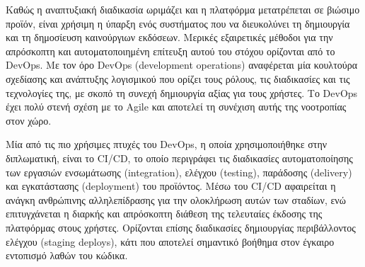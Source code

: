 Καθώς η αναπτυξιακή διαδικασία ωριμάζει και η πλατφόρμα μετατρέπεται σε βιώσιμο προϊόν, είναι χρήσιμη η ύπαρξη ενός συστήματος που να διευκολύνει τη δημιουργία και τη δημοσίευση καινούργιων εκδόσεων. Μερικές εξαιρετικές μέθοδοι για την απρόσκοπτη και αυτοματοποιημένη επίτευξη αυτού του στόχου ορίζονται από το DevOps. Με τον όρο DevOps (development operations) αναφέρεται μία κουλτούρα σχεδίασης και ανάπτυξης λογισμικού που ορίζει τους ρόλους, τις διαδικασίες και τις τεχνολογίες της, με σκοπό τη συνεχή δημιουργία αξίας για τους χρήστες. Το DevOps έχει πολύ στενή σχέση με το Agile και αποτελεί τη συνέχιση αυτής της νοοτροπίας στον χώρο.

Μία από τις πιο χρήσιμες πτυχές του DevOps, η οποία χρησιμοποιήθηκε στην διπλωματική, είναι το CI/CD, το οποίο περιγράφει τις διαδικασίες αυτοματοποίησης των εργασιών ενσωμάτωσης (integration), ελέγχου (testing), παράδοσης (delivery) και εγκατάστασης (deployment) του προϊόντος. Μέσω του CI/CD αφαιρείται η ανάγκη ανθρώπινης αλληλεπίδρασης για την ολοκλήρωση αυτών των σταδίων, ενώ επιτυγχάνεται η διαρκής και απρόσκοπτη διάθεση της τελευταίες έκδοσης της πλατφόρμας στους χρήστες. Ορίζονται επίσης διαδικασίες δημιουργίας περιβάλλοντος ελέγχου (staging deploys), κάτι που αποτελεί σημαντικό βοήθημα στον έγκαιρο εντοπισμό λαθών του κώδικα.
